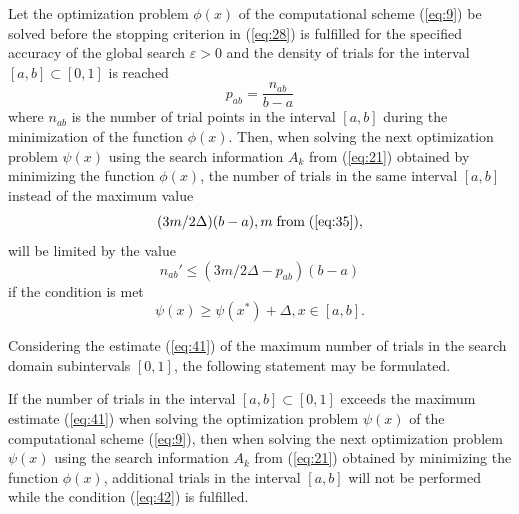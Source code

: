 \documentclass[smallextended]{svjour3}       %
\begin{document}
\begin{theorem}
Let the optimization problem $\phi(x)$ of the computational scheme (\ref{eq:9}) be solved before the stopping criterion in (\ref{eq:28}) is fulfilled for the specified accuracy of the global search $\varepsilon > 0$ and the density of trials for the interval $[a,b] \subset [0,1]$ is reached
\begin{equation}\label{eq:39}
p_{ab}=\frac{n_{ab}}{b-a}
\end{equation}
where $n_{ab}$ is the number of trial points in the interval $[a,b]$ during the minimization of the function $\phi(x)$. Then, when solving the next optimization problem $\psi(x)$ using the search information $A_k$ from (\ref{eq:21}) obtained by minimizing the function $\phi(x)$, the number of trials in the same interval $[a,b]$ instead of the maximum value
\begin{equation}\label{eq:40}
(3m/2\Delta)(b-a), m \; \text{from} \;  (\ref{eq:35}),
\end{equation}
will be limited by the value
\begin{equation}\label{eq:41}
n_{ab}' \leq (3m/2\Delta - p_{ab})(b-a)
\end{equation}
if the condition is met
\begin{equation}\label{eq:42}
\psi(x) \geq \psi(x^*)+\Delta, x \in [a,b].
\end{equation}
\end{theorem}

Considering the estimate (\ref{eq:41}) of the maximum number of trials in the search domain subintervals $[0,1]$, the following statement may be formulated.

\begin{theorem}
If the number of trials in the interval $[a,b]\subset[0,1]$ exceeds the maximum estimate (\ref{eq:41}) when solving the optimization problem $\psi(x)$ of the computational scheme (\ref{eq:9}), then when solving the next optimization problem $\psi(x)$ using the search information $A_k$ from (\ref{eq:21}) obtained by minimizing the function $\phi(x)$, additional trials in the interval $[a,b]$ will not be performed while the condition (\ref{eq:42}) is fulfilled.
\end{theorem}
\end{document}
